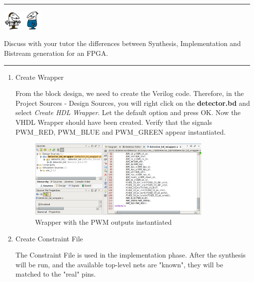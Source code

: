 \documentclass{article}
\begin{document}
\noindent\rule{16.5cm}{1pt}

\noindent\begin{minipage}{.1\textwidth}
  \centering
  \includegraphics[height=1cm]{img/talking_icon.png}
\end{minipage}
\begin{minipage}{.8\textwidth}
\hspace{0.2cm} Discuss with your tutor the differences between Synthesis, Implementation and Bistream generation for an FPGA.
\end{minipage}%

\noindent\rule{16.5cm}{1pt}

\begin{enumerate}


\item Create Wrapper

From the block design, we need to create the Verilog code. Therefore, in the Project Sources - Design Sources, you will right click on the \textbf{detector.bd} and select \textit {Create HDL Wrapper}. Let the default option and press OK. Now the VHDL Wrapper should have been created. Verify that the signals PWM\_RED, PWM\_BLUE and PWM\_GREEN appear instantiated. 


\begin{figure}[h!]
    \centering
    \includegraphics[width=0.85\textwidth]{img/16_wrapper_instantiated.png}
    \caption{Wrapper with the PWM outputs instantiated}
    \label{fig:block_diagram_system}
\end{figure}


 \item Create Constraint File
 
The Constraint File is used in the implementation phase. After the synthesis will be run, and the available top-level nets are "known", they will be matched to the "real" pins.
  

\end{enumerate}
\end{document}

